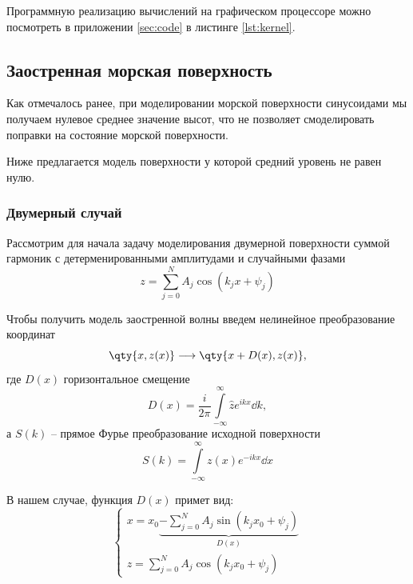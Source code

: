 Программную реализацию вычислений на графическом процессоре можно посмотреть в
приложении \ref{sec:code} в листинге \ref{lst:kernel}.

\subsection{Заостренная морская поверхность}
\label{sub:cwm}

Как отмечалось ранее, при моделировании морской поверхности синусоидами мы
получаем нулевое среднее значение высот, что не позволяет смоделировать
поправки на состояние морской поверхности. 

Ниже предлагается модель поверхности у которой средний уровень не равен нулю.



\subsubsection{Двумерный случай}%
\label{ssub:odnomernyi_sluchai}

Рассмотрим для начала задачу моделирования двумерной поверхности суммой гармоник с детерменированными амплитудами и случайными фазами
 \begin{equation}
     z = \sum\limits_{j=0}^{N} A_j \cos(k_j x + \psi_j)
 \end{equation}

Чтобы получить модель заостренной волны введем нелинейное преобразование координат
\begin{equation}
    \qty{x,z(x)} \longrightarrow \qty{x + D(x),z(x)},
\end{equation}
где $D(x)$ горизонтальное смещение
\begin{equation}
    D(x) =  \frac{i}{2\pi} \int\limits_{-\infty}^{\infty}   \hat z e^{ikx} \dd{k},
\end{equation}
а $S(k)$ -- прямое Фурье преобразование исходной поверхности
\begin{equation}
    S(k) = \int\limits_{-\infty}^{\infty} z(x) e^{-ikx} \dd x 
\end{equation}

В нашем случае, функция $D(x)$ примет вид: 
\begin{equation}
    \begin{cases}
    x = x_{0} \underbrace{
    - \sum\limits_{j=0}^{N} A_j \sin(k_j x_0 + \psi_j)
    }_{D(x)} \\
    z = \sum\limits_{j=0}^{N} A_j \cos(k_j x_{0} + \psi_j)
    \end{cases}
\end{equation}

